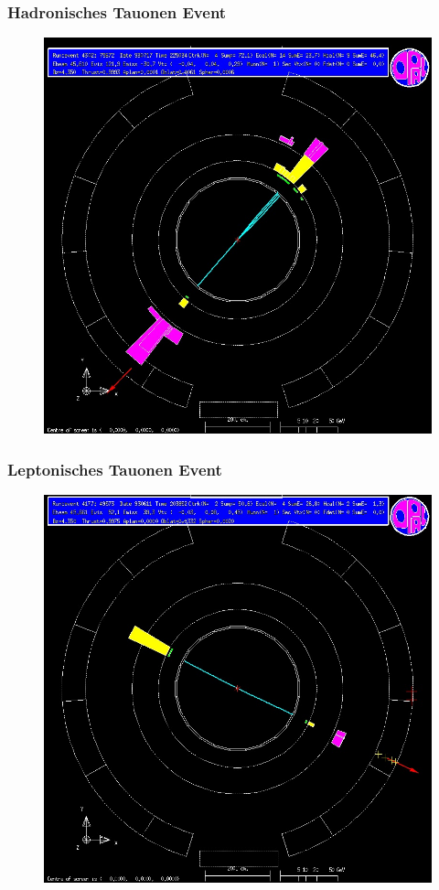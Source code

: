 \begin{frame}
	\frametitle{Hadronisches Tauonen Event}
	\begin{figure}
		\centering
		\includegraphics[width=0.63\linewidth]{graphics/tauonopalhadronisch}
	\end{figure}
\end{frame}

\begin{frame}
	\frametitle{Leptonisches Tauonen Event}
	\begin{figure}
		\centering
		\includegraphics[width=0.63\linewidth]{graphics/tauonopalleptonisch}
	\end{figure}
\end{frame}

